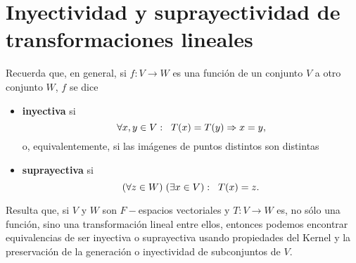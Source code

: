 \section{Inyectividad y suprayectividad de transformaciones lineales}
Recuerda que, en general, si $f: V \longrightarrow W$ es una
función de un conjunto $V$ a otro conjunto $W$, $f$ se dice
\begin{itemize}
	\item \textbf{inyectiva} si
	\[
	\forall x, y \in V :\hspace{0.2cm}
	T(x) = T(y) \Rightarrow x = y,
	\]
	o, equivalentemente, si las imágenes de puntos
	distintos son distintas
	\item \textbf{suprayectiva} si 
	\[
	(\forall z \in W) \hspace{0.1cm}
	(\exists x \in V): \hspace{0.2cm} T(x) = z.
	\]
\end{itemize}
Resulta que, si $V$ y $W$ son 
$F-$espacios vectoriales y $T: V \longrightarrow W$ es,
no sólo una función, sino una transformación lineal entre ellos,
entonces podemos encontrar equivalencias de ser inyectiva
o suprayectiva usando propiedades del Kernel y la 
preservación de la generación o inyectividad de subconjuntos de $V$.

